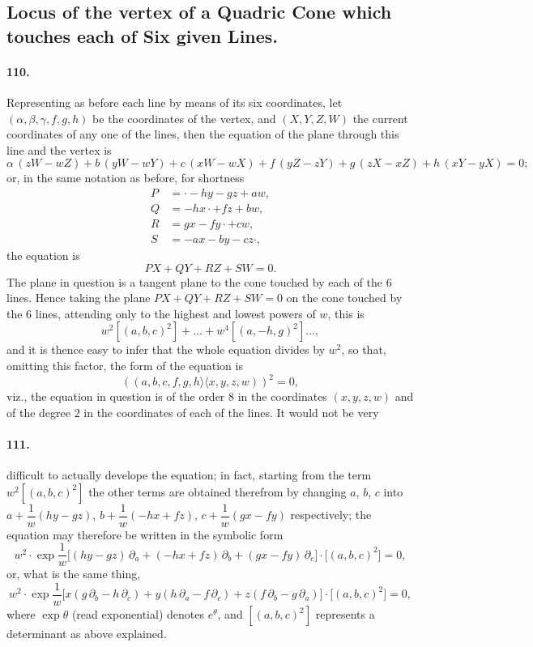 \documentclass[11pt,a4paper]{article}
\providecommand{\quant}{\mathrel{\rangle\!\langle}}
\begin{document}
\bigskip

\subsection*{Locus of the vertex of a Quadric Cone which touches each of Six given Lines.}

\paragraph{110.}
Representing as before each line by means of its six coordinates, let
$(\alpha, \beta, \gamma, f, g, h)$ be the coordinates of the vertex, and $(X, Y, Z, W)$
the current coordinates of any one of the lines, then the equation of the plane
through this line and the vertex is
\[
\alpha\,(z W - w Z) + b\,(y W - w Y) + c\,(x W - w X)
+ f\,(y Z - z Y) + g\,(z X - x Z) + h\,(x Y - y X) = 0;
\]
or, in the same notation as before, for shortness
\begin{align*}
P &= \cdot - h y - g z + a w,\\
Q &= -h x \cdot + f z + b w,\\
R &= g x - f y \cdot + c w,\\
S &= -a x - b y - c z \cdot ,
\end{align*}
the equation is
\[
PX + QY + RZ + SW = 0.
\]
The plane in question is a tangent plane to the cone touched by each of the $6$ lines.
Hence taking the plane $PX + QY + RZ + SW = 0$ on the cone touched by the $6$ lines,
attending only to the highest and lowest powers of $w$, this is
\[
w^2[(a, b, c)^2] + \ldots + w^4[(a, -h, g)^2] \ldots,
\]
and it is thence easy to infer that the whole equation divides by $w^2$, so that,
omitting this factor, the form of the equation is
\[
((a, b, c, f, g, h \quant x, y, z, w))^2 = 0,
\]
viz., the equation in question is of the order $8$ in the coordinates $(x, y, z, w)$
and of the degree $2$ in the coordinates of each of the lines. It would not be very
\bigskip

\paragraph{111.}
difficult to actually develope the equation; in fact, starting from the term
$w^2[(a, b, c)^2]$ the other terms are obtained therefrom by changing $a$, $b$, $c$
into $a + \dfrac{1}{w}(hy - gz)$, $b + \dfrac{1}{w}(-hx + fz)$,
$c + \dfrac{1}{w}(gx - fy)$ respectively; the equation may therefore be written in
the symbolic form
\[
w^2 \cdot \exp\frac{1}{w}\!\bigl[(hy - gz)\,\partial_a + (-hx + fz)\,\partial_b
+ (gx - fy)\,\partial_c\bigr]\cdot\bigl[(a, b, c)^2\bigr] = 0,
\]
or, what is the same thing,
\[
w^2 \cdot \exp\frac{1}{w}\!\bigl[x(g\,\partial_b - h\,\partial_c)
+ y(h\,\partial_a - f\,\partial_c) + z(f\,\partial_b - g\,\partial_a)\bigr]
\cdot\bigl[(a, b, c)^2\bigr] = 0,
\]
where $\exp\theta$ (read exponential) denotes $e^\theta$, and $[(a, b, c)^2]$
represents a determinant as above explained.
\end{document}
